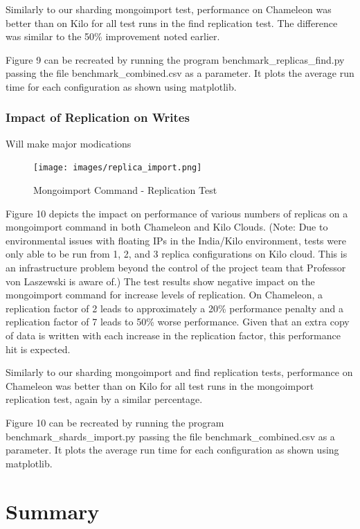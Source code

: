 \documentclass[9pt,twocolumn,twoside]{styles/osajnl}
\begin{document}
Similarly to our sharding mongoimport test, performance on Chameleon was better than on Kilo for all test runs in the find replication test.  The difference was similar to the 50\% improvement noted earlier.

Figure 9 can be recreated by running the program benchmark\_replicas\_find.py passing the file benchmark\_combined.csv as a parameter.  It plots the average run time for each configuration as shown using matplotlib.



\subsubsection{Impact of Replication on Writes}

Will make major modications

\begin{figure}[!ht]
  \texttt{[image: images/replica\_import.png]}
  \caption{Mongoimport Command - Replication Test}
\end{figure}


Figure 10 depicts the impact on performance of various numbers of replicas on a mongoimport command in both Chameleon and Kilo Clouds.  (Note: Due to environmental issues with floating IPs in the India/Kilo environment, tests were only able to be run from 1, 2, and 3 replica configurations on Kilo cloud.  This is an infrastructure problem beyond the control of the project team that Professor von Laszewski is aware of.)  The test results show negative impact on the mongoimport command for increase levels of replication.  On Chameleon, a replication factor of 2 leads to approximately a 20\% performance penalty and a replication factor of 7 leads to 50\% worse performance.  Given that an extra copy of data is written with each increase in the replication factor, this performance hit is expected.  

Similarly to our sharding mongoimport and find replication tests, performance on Chameleon was better than on Kilo for all test runs in the mongoimport replication test, again by a similar percentage.

Figure 10 can be recreated by running the program benchmark\_shards\_import.py passing the file benchmark\_combined.csv as a parameter.  It plots the average run time for each configuration as shown using matplotlib.



\section{Summary}
\end{document}
